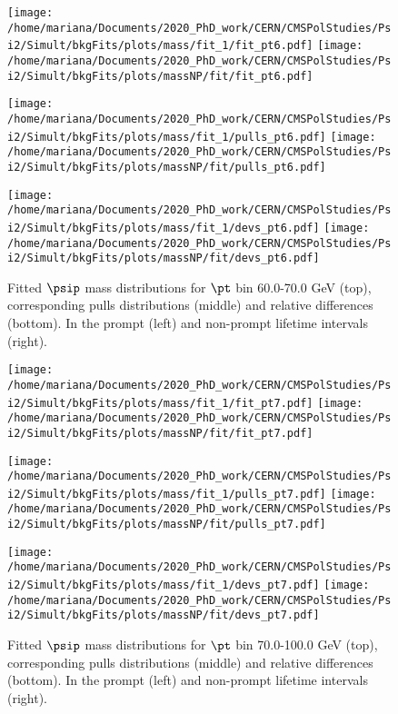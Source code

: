 \pagebreak

\begin{figure}[h!]
\centering
\texttt{[image: /home/mariana/Documents/2020\_PhD\_work/CERN/CMSPolStudies/Psi2/Simult/bkgFits/plots/mass/fit\_1/fit\_pt6.pdf]}
\texttt{[image: /home/mariana/Documents/2020\_PhD\_work/CERN/CMSPolStudies/Psi2/Simult/bkgFits/plots/massNP/fit/fit\_pt6.pdf]}

\texttt{[image: /home/mariana/Documents/2020\_PhD\_work/CERN/CMSPolStudies/Psi2/Simult/bkgFits/plots/mass/fit\_1/pulls\_pt6.pdf]}
\texttt{[image: /home/mariana/Documents/2020\_PhD\_work/CERN/CMSPolStudies/Psi2/Simult/bkgFits/plots/massNP/fit/pulls\_pt6.pdf]}

\texttt{[image: /home/mariana/Documents/2020\_PhD\_work/CERN/CMSPolStudies/Psi2/Simult/bkgFits/plots/mass/fit\_1/devs\_pt6.pdf]}
\texttt{[image: /home/mariana/Documents/2020\_PhD\_work/CERN/CMSPolStudies/Psi2/Simult/bkgFits/plots/massNP/fit/devs\_pt6.pdf]}
\caption{Fitted $\psip$ mass distributions for $\pt$ bin 60.0-70.0 GeV (top), corresponding pulls distributions (middle) and relative differences (bottom). In the prompt (left) and non-prompt lifetime intervals (right).}\label{f:m_fit_6}
\end{figure}

\pagebreak

\begin{figure}[h!]
\centering
\texttt{[image: /home/mariana/Documents/2020\_PhD\_work/CERN/CMSPolStudies/Psi2/Simult/bkgFits/plots/mass/fit\_1/fit\_pt7.pdf]}
\texttt{[image: /home/mariana/Documents/2020\_PhD\_work/CERN/CMSPolStudies/Psi2/Simult/bkgFits/plots/massNP/fit/fit\_pt7.pdf]}

\texttt{[image: /home/mariana/Documents/2020\_PhD\_work/CERN/CMSPolStudies/Psi2/Simult/bkgFits/plots/mass/fit\_1/pulls\_pt7.pdf]}
\texttt{[image: /home/mariana/Documents/2020\_PhD\_work/CERN/CMSPolStudies/Psi2/Simult/bkgFits/plots/massNP/fit/pulls\_pt7.pdf]}

\texttt{[image: /home/mariana/Documents/2020\_PhD\_work/CERN/CMSPolStudies/Psi2/Simult/bkgFits/plots/mass/fit\_1/devs\_pt7.pdf]}
\texttt{[image: /home/mariana/Documents/2020\_PhD\_work/CERN/CMSPolStudies/Psi2/Simult/bkgFits/plots/massNP/fit/devs\_pt7.pdf]}
\caption{Fitted $\psip$ mass distributions for $\pt$ bin 70.0-100.0 GeV (top), corresponding pulls distributions (middle) and relative differences (bottom). In the prompt (left) and non-prompt lifetime intervals (right).}\label{f:m_fit_7}
\end{figure}

\pagebreak

